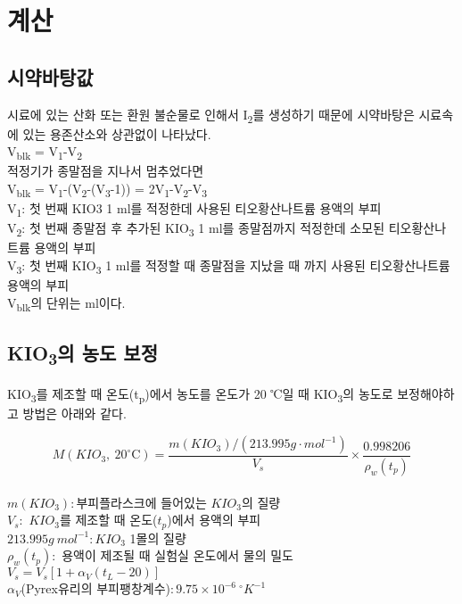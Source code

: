 \documentclass[
]{book}
\begin{document}
\hypertarget{uxacc4uxc0b0}{%
\chapter{계산}\label{uxacc4uxc0b0}}

\hypertarget{uxc2dcuxc57duxbc14uxd0d5uxac12}{%
\section{시약바탕값}\label{uxc2dcuxc57duxbc14uxd0d5uxac12}}

시료에 있는 산화 또는 환원 불순물로 인해서 I\textsubscript{2}를 생성하기 때문에 시약바탕은 시료속에 있는 용존산소와 상관없이 나타났다.\\
V\textsubscript{blk} = V\textsubscript{1}-V\textsubscript{2}\\
적정기가 종말점을 지나서 멈추었다면\\
V\textsubscript{blk} = V\textsubscript{1}-(V\textsubscript{2}-(V\textsubscript{3}-1)) = 2V\textsubscript{1}-V\textsubscript{2}-V\textsubscript{3}\\
V\textsubscript{1}: 첫 번째 KIO3 1 ml를 적정한데 사용된 티오황산나트륨 용액의 부피\\
V\textsubscript{2}: 첫 번째 종말점 후 추가된 KIO\textsubscript{3} 1 ml를 종말점까지 적정한데 소모된 티오황산나트륨 용액의 부피\\
V\textsubscript{3}: 첫 번째 KIO\textsubscript{3} 1 ml를 적정할 때 종말점을 지났을 때 까지 사용된 티오황산나트륨 용액의 부피\\
V\textsubscript{blk}의 단위는 ml이다.

\hypertarget{kio3uxc758-uxb18duxb3c4-uxbcf4uxc815}{%
\section{\texorpdfstring{KIO\textsubscript{3}의 농도 보정}{KIO3의 농도 보정}}\label{kio3uxc758-uxb18duxb3c4-uxbcf4uxc815}}

KIO\textsubscript{3}를 제조할 때 온도(t\textsubscript{p})에서 농도를 온도가 20 ℃일 때 KIO\textsubscript{3}의 농도로 보정해야하고 방법은 아래와 같다.

\[M(KIO_{3}, ~ 20^{\circ} \mathrm C)= \frac {m(KIO_{3})/(213.995g \cdot mol^{-1})}{V_{s}} \times \frac{0.998206}{\rho _{w} (t_{p})}\]\\
\(m(KIO_{3}):\)부피플라스크에 들어있는 \(KIO_3\)의 질량\\
\(V_{s}:\) \(KIO_3\)를 제조할 때 온도(\(t_{p}\))에서 용액의 부피\\
\(213.995g~mol^{-1} : KIO_3\) 1몰의 질량\\
\(\rho_{w} (t_{p}):\) 용액이 제조될 때 실험실 온도에서 물의 밀도\\
\(V_{s} = V_{s}[1+\alpha_{V} (t_{L} -20)]\)\\
\(\alpha_{V}\)(Pyrex유리의 부피팽창계수)\(: 9.75 \times 10^{-6} ~^{\circ} K^{-1}\)
\end{document}
